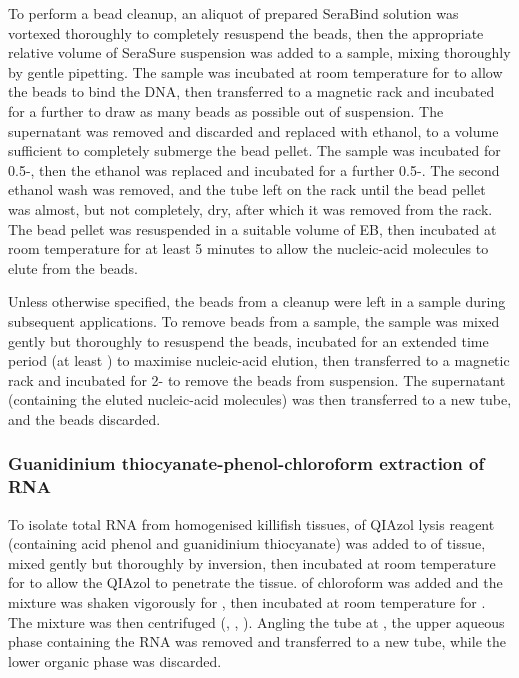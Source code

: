 To perform a bead cleanup, an aliquot of prepared SeraBind solution was vortexed thoroughly to completely resuspend the beads, then the appropriate relative volume of SeraSure suspension was added to a sample, mixing thoroughly by gentle pipetting. The sample was incubated at room temperature for  to allow the beads to bind the DNA, then transferred to a magnetic rack and incubated for a further  to draw as many beads as possible out of suspension. The supernatant was removed and discarded and replaced with  ethanol, to a volume sufficient to completely submerge the bead pellet. The sample was incubated for 0.5-, then the ethanol was replaced and incubated for a further 0.5-. The second ethanol wash was removed, and the tube left on the rack until the bead pellet was almost, but not completely, dry, after which it was removed from the rack. The bead pellet was resuspended in a suitable volume of EB, then incubated at room temperature for at least 5 minutes to allow the nucleic-acid molecules to elute from the beads.

Unless otherwise specified, the beads from a cleanup were left in a sample during subsequent applications. To remove beads from a sample, the sample was mixed gently but thoroughly to resuspend the beads, incubated for an extended time period (at least ) to maximise nucleic-acid elution, then transferred to a magnetic rack and incubated for 2- to remove the beads from suspension. The supernatant (containing the eluted nucleic-acid molecules) was then transferred to a new tube, and the beads discarded.

\subsubsection{Guanidinium thiocyanate-phenol-chloroform extraction of RNA}
\label{sec:methods_molec_standard_qiazol}

To isolate total RNA from homogenised killifish tissues,  of QIAzol lysis reagent (containing acid phenol and guanidinium thiocyanate) was added to  of tissue, mixed gently but thoroughly by inversion, then incubated at room temperature for  to allow the QIAzol to penetrate the tissue.  of chloroform was added and the mixture was shaken vigorously for , then incubated at room temperature for . The mixture was then centrifuged (, , ). Angling the tube at , the upper aqueous phase containing the RNA was removed and transferred to a new tube, while the lower organic phase was discarded.

